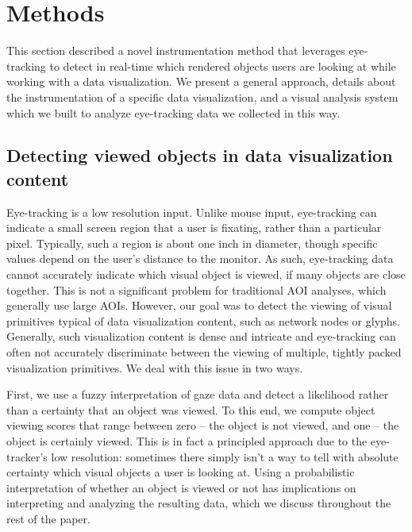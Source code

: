 \section{Methods}\label{sec:Methods}
This section described a novel instrumentation method that leverages eye-tracking to detect in real-time which rendered objects users are looking at while working with a data visualization.  We present a general approach, details about the instrumentation of a specific data visualization, and a visual analysis system which we built to analyze eye-tracking data we collected in this way. 

\subsection{Detecting viewed objects in data visualization content}
Eye-tracking is a low resolution input. Unlike mouse input, eye-tracking can indicate a small screen region that a user is fixating, rather than a particular pixel. Typically, such a region is about one inch in diameter, though specific values depend on the user's distance to the monitor. As such, eye-tracking data cannot accurately indicate which visual object is viewed, if many objects are close together. This is not a significant problem for traditional AOI analyses, which generally use large AOIs. However, our goal was to detect the viewing of visual primitives typical of data visualization content, such as network nodes or glyphs. Generally, such visualization content is dense and intricate and eye-tracking can often not accurately discriminate between the viewing of multiple, tightly packed visualization primitives. We deal with this issue in two ways. 

First, we use a fuzzy interpretation of gaze data and detect a likelihood rather than a certainty that an object was viewed. To this end, we compute object viewing scores that range between zero – the object is not viewed, and one – the object is certainly viewed. This is in fact a principled approach due to the eye-tracker's low resolution: sometimes there simply isn't a way to tell with absolute certainty which visual objects a user is looking at. Using a probabilistic interpretation of whether an object is viewed or not has implications on interpreting and analyzing the resulting data, which we discuss throughout the rest of the paper.  

